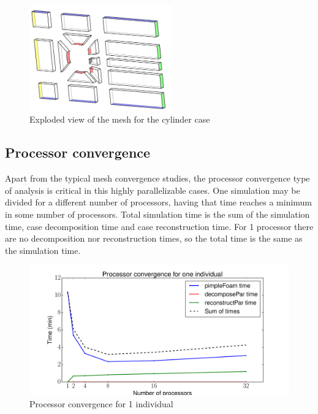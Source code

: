 \newpage

     \begin{figure}[h!]
        \centering
        \includegraphics[width=0.55\textwidth]{Figures/3/cylinderMeshBC.png}
        \caption{Exploded view of the mesh for the cylinder case}
        \label{fig:cylBC}
    \end{figure}


\subsection*{Processor convergence}

Apart from the typical mesh convergence studies, the processor convergence type of analysis is critical in this highly parallelizable cases. One simulation may be divided for a different number of processors, having that time reaches a minimum in some number of processors. Total simulation time is the sum of the simulation time, case decomposition time and case reconstruction time. For 1 processor there are no decomposition nor reconstruction times, so the total time is the same as the simulation time. 

     \begin{figure}[h!]
        \centering
        \includegraphics[height=0.35\textheight]{Figures/3/procConv_1ind.pdf}
        \caption{Processor convergence for 1 individual}
        \label{fig:procConvergenceCyl}
    \end{figure}

